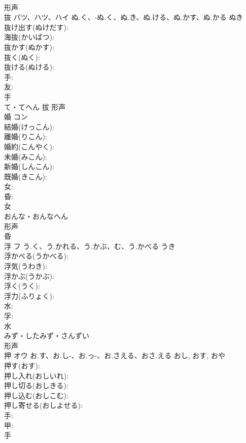 \documentclass[8pt]{extreport}
\begin{document}
\begin{CJK}{UTF8}{min}
\\	形声 
\\	抜	バツ、ハツ、ハイ	ぬ.く、-ぬ.く、ぬ.き、ぬ.ける、ぬ.かす、ぬ.かる	ぬき	
\\	抜け出す(ぬけだす): 
\\	海抜(かいばつ): 
\\	抜かす(ぬかす): 
\\	抜く(ぬく): 
\\	抜ける(ぬける): 
\\	手: 
\\	友: 
\\	手	
\\	て・てへん	拔	形声 
\\	婚	コン			
\\	結婚(けっこん): 
\\	離婚(りこん): 
\\	婚約(こんやく): 
\\	未婚(みこん): 
\\	新婚(しんこん): 
\\	既婚(きこん): 
\\	女: 
\\	昏: 
\\	女	
\\	おんな・おんなへん	
\\	形声 
\\	昏 
\\	浮	フ	う.く、う.かれる、う.かぶ、む、う.かべる	うき	
\\	浮かべる(うかべる): 
\\	浮気(うわき): 
\\	浮かぶ(うかぶ): 
\\	浮く(うく): 
\\	浮力(ふりょく): 
\\	水: 
\\	孚: 
\\	水	
\\	みず・したみず・さんずい	
\\	形声 
\\	押	オウ	お.す、お.し-、お.っ-、お.さえる、おさ.える	おし, おす, おや	
\\	押す(おす): 
\\	押し入れ(おしいれ): 
\\	押し切る(おしきる): 
\\	押し込む(おしこむ): 
\\	押し寄せる(おしよせる): 
\\	手: 
\\	甲: 
\\	手	

\end{CJK}
\end{document}
